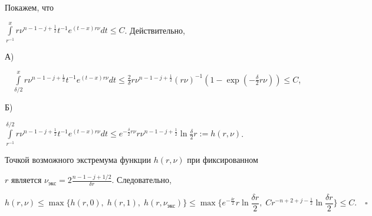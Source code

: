 Покажем, что


$\int\limits^x_{r^{-1}}r\nu^{n-1-j+\frac{1}{2}}t^{-1}


e^{(t-x)r\nu}dt\le C$. Действительно,





А)


$\quad\int\limits^x_{\delta/2}r\nu^{n-1-j+\frac{1}{2}}t^{-1}


e^{(t-x)r\nu}dt\le \frac{2}{\delta}r\nu^{n-1-j+\frac{1}{2}}


(r\nu)^{-1}(1-\exp(-\frac{\delta}{2}r\nu))\le C$,





Б)


$\int\limits^{\delta/2}_{r^{-1}}r\nu^{n-1-j+\frac{1}{2}}


t^{-1}e^{(t-x)r\nu}dt \le e^{-\frac{\delta}{2}r\nu}


r\nu^{n-1-j+\frac{1}{2}}\ln\frac{\delta}{2}r:=h(r,\nu)$.





Точкой возможного экстремума функции $h(r,\nu)$ при фиксированном


$r$ является $\nu_{экс}=2\frac{n-1-j+1/2}{\delta r}$. Следовательно,


$$


h(r,\nu)\le\max\{h(r,0),\;h(r,1),\;h(r,\nu_{экс})\}\le


\max\{e^{-\frac{\delta r}{2}}r\ln\frac{\delta r}{2},\;


C r^{-n+2+j-\frac{1}{2}}\ln\frac{\delta r}{2}\}\le C.\quad\square


$$





